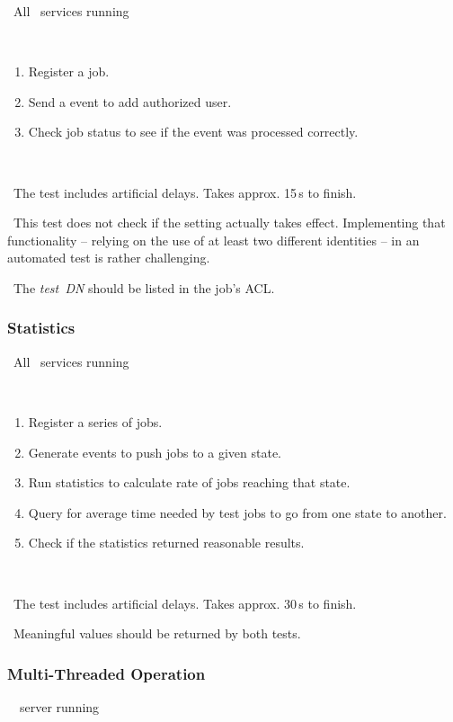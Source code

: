 \req\ All \LB\ services running

\what\
\begin{enumerate}
\item Register a job.
\item Send a  event to add authorized user.
\item Check job status to see if the event was processed correctly.
\end{enumerate}

\how\ 

\note\ The test includes artificial delays. Takes approx. 15\,s to finish.

\note\ This test does not check if the setting actually takes effect. Implementing that functionality -- relying on the use of at least two different identities -- in an automated test is rather challenging. 

\result\ The \emph{test~DN} should be listed in the job's ACL.

\subsubsection{Statistics}

\req\ All \LB\ services running

\what\
\begin{enumerate}
\item Register a series of jobs.
\item Generate events to push jobs to a given state.
\item Run statistics to calculate rate of jobs reaching that state. 
\item Query for average time needed by test jobs to go from one state to another.
\item Check if the statistics returned reasonable results. 
\end{enumerate}

\how\ 

\note\ The test includes artificial delays. Takes approx. 30\,s to finish.

\result\ Meaningful values should be returned by both tests. 

\subsubsection{Multi-Threaded Operation}

\req\ \LB\ server running

